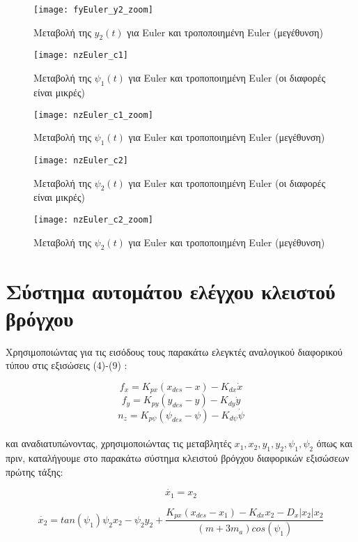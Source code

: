\documentclass{article}
\begin{document}
\begin{figure}[h!]
 \centering
\texttt{[image: fyEuler\_y2\_zoom]}
\caption{Μεταβολή της $y_2(t)$ για Euler και τροποποιημένη Euler (μεγέθυνση)}
\label{l_8}
\end{figure}
\clearpage

\clearpage
\begin{figure}[h!]
\texttt{[image: nzEuler\_c1]}
\caption{Μεταβολή της $\psi_1(t)$ για Euler και τροποποιημένη
 Euler (οι διαφορές είναι μικρές)}
\end{figure}

\begin{figure}[h!]
\texttt{[image: nzEuler\_c1\_zoom]}
\caption{Μεταβολή της $\psi_1(t)$ για Euler και τροποποιημένη Euler (μεγέθυνση)}
\label{l_10}
\end{figure}
\clearpage

\clearpage
\begin{figure}[h!]
\texttt{[image: nzEuler\_c2]}
\caption{Μεταβολή της $\psi_2(t)$ για Euler και τροποποιημένη Euler (οι διαφορές είναι μικρές)}
\end{figure}

\begin{figure}[h!]
\texttt{[image: nzEuler\_c2\_zoom]}
\caption{Μεταβολή της $\psi_2(t)$ για Euler και τροποποιημένη Euler (μεγέθυνση)}
\label{l_12}
\end{figure}
\clearpage

\section{Σύστημα αυτομάτου ελέγχου κλειστού βρόγχου}
Χρησιμοποιώντας για τις εισόδους τους παρακάτω ελεγκτές αναλογικού διαφορικού τύπου στις εξισώσεις (4)-(9) :

\[f_x = K_{px}(x_{des} - x) - K_{dx}\dot{x} \]
\[f_y = K_{py}(y_{des} - y) - K_{dy}\dot{y} \]
\[n_z = K_{p\psi}(\psi_{des} - \psi) - K_{d\psi}\dot{\psi} \]
\\
και αναδιατυπώνοντας, χρησιμοποιώντας τις μεταβλητές \(x_1, x_2, y_1, y_2, \psi_1, \psi_2\) όπως και πριν, καταλήγουμε στο παρακάτω σύστημα κλειστού βρόγχου διαφορικών εξισώσεων πρώτης τάξης:



\begin{equation}
\dot{x_1} = x_2
\end{equation}

\begin{equation}
\dot{x_2} = tan(\psi_1)\psi_2x_2 - \psi_2y_2 + \frac{K_{px}(x_{des} - x_1) - K_{dx}x_2 - D_x|x_2|x_2}{(m + 3m_a)cos(\psi_1)} 
\end{equation}
\end{document}
